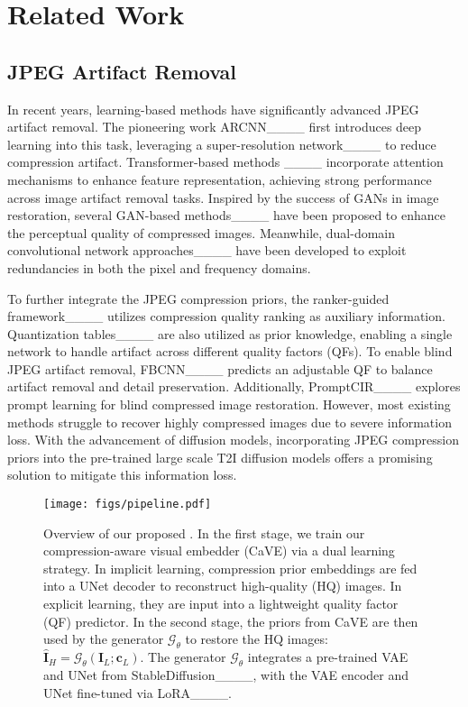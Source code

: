 \section{Related Work}
\vspace{-1mm}
\subsection{JPEG Artifact Removal}
\vspace{-1mm}
In recent years, learning-based methods have significantly advanced JPEG artifact removal. The pioneering work ARCNN____ first introduces deep learning into this task, leveraging a super-resolution network____ to reduce compression artifact. Transformer-based methods ____ incorporate attention mechanisms to enhance feature representation, achieving strong performance across image artifact removal tasks. Inspired by the success of GANs in image restoration, several GAN-based methods____ have been proposed to enhance the perceptual quality of compressed images. Meanwhile, dual-domain convolutional network approaches____ have been developed to exploit redundancies in both the pixel and frequency domains. 

To further integrate the JPEG compression priors, the ranker-guided framework____ utilizes compression quality ranking as auxiliary information.
Quantization tables____ are also utilized as prior knowledge, enabling a single network to handle artifact across different quality factors (QFs). To enable blind JPEG artifact removal, FBCNN____ predicts an adjustable QF to balance artifact removal and detail preservation. Additionally, PromptCIR____ explores prompt learning for blind compressed image restoration. However, most existing methods struggle to recover highly compressed images due to severe information loss. With the advancement of diffusion models, incorporating JPEG compression priors into the pre-trained large scale T2I diffusion models offers a promising solution to mitigate this information loss. 

\begin{figure*}[t]
    \begin{center}
        \texttt{[image: figs/pipeline.pdf]}
    \end{center}
    \vspace{-20pt}
    \caption{Overview of our proposed \mymodel. In the first stage, we train our compression-aware visual embedder (CaVE) via a dual learning strategy. In implicit learning, compression prior embeddings are fed into a UNet decoder to reconstruct high-quality (HQ) images. In explicit learning, they are input into a lightweight quality factor (QF) predictor. In the second stage, the priors from CaVE are then used by the generator $\mathcal{G}_\theta$ to restore the HQ images: $\hat{\mathbf{I}}_H=\mathcal{G}_\theta(\mathbf{I}_L;\mathbf{c}_L)$. The generator $\mathcal{G}_\theta$ integrates a pre-trained VAE and UNet from StableDiffusion____, with the VAE encoder and UNet fine-tuned via LoRA____.} 
    \label{fig:pipeline}
    \vspace{-15pt}
\end{figure*}



